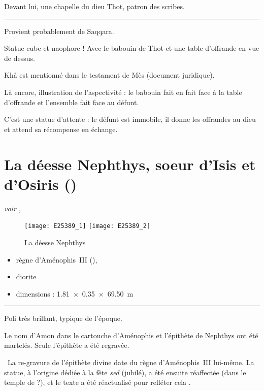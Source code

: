\documentclass[dvipsnames,a4paper,twoside,10pt,openany,article]{memoir}
\newcommand{\separation}{%
  {\noi\hspace*{\fill}\rule{.33\textwidth}{1pt}\hspace*{\fill}}%
}
\begin{document}
Devant lui, une chapelle du dieu Thot, patron des scribes.

\separation

Provient probablement de Saqqara.

Statue cube et naophore ! Avec le babouin de Thot et une table 
d'offrande en vue de dessus.

Khâ est mentionné dans le testament de Mès (document juridique).

Là encore, illustration de l'aspectivité  : le babouin fait en fait face à la table 
d'offrande et l'ensemble fait face au défunt.

C'est une statue d'attente : le défunt est immobile, il donne les 
offrandes au dieu et attend sa récompense en échange.


\chapter{La déesse Nephthys, soeur d'Isis et d'Osiris ()}
\label{sec:E25389}

\puceb{} \emph{voir , }
\bigskip

\begin{figure}[!h]
  \texttt{[image: E25389\_1]}%
  \qquad%
  \texttt{[image: E25389\_2]}%
  \caption{La déesse Nephthys }
  \label{fig:E25389}
\end{figure}

\begin{itemize}
  \item règne d'Aménophis~III (), 
  \item diorite
  \item dimensions : \SI{1.81x0.35x69.50}{\m}
\end{itemize}

\separation

Poli très brillant, typique de l'époque.

Le nom d'Amon dans le cartouche d'Aménophis et l'épithète de Nephthys 
ont été martelés. Seule l'épithète a été regravée.

\quad\donc~La re-gravure de l'épithète divine date du règne 
d'Aménophis~III lui-même. La statue, à l'origine dédiée à la fête 
\emph{sed} (jubilé), a été ensuite réaffectée (dans le temple de 
?), et le texte a été réactualisé pour refléter cela 
.
\end{document}

